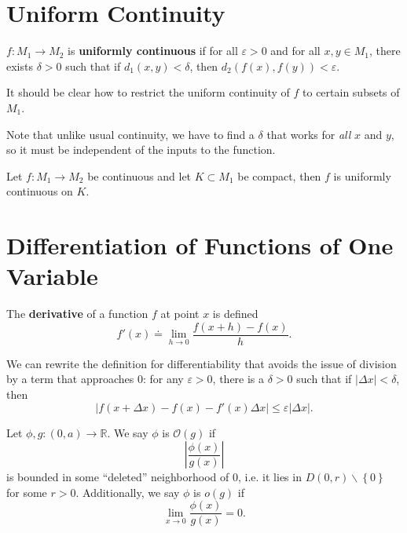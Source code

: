 \documentclass[twoside,10pt]{report}
\begin{document}

\section{Uniform Continuity}
\begin{defn}[]
	$f:M_1 \to M_2$ is \textbf{uniformly continuous} if for all $\varepsilon>0$ and for all $x,y \in M_1$, there exists $\delta>0$ such that if $d_1(x,y) < \delta$, then $d_2(f(x), f(y)) < \varepsilon$.
\end{defn}

It should be clear how to restrict the uniform continuity of $f$ to certain subsets of $M_1$.

Note that unlike usual continuity, we have to find a $\delta$ that works for \textit{all} $x$ and $y$, so it must be independent of the inputs to the function.

\begin{thrm}[]
Let $f:M_1\to M_2$ be continuous and let $K \subset M_1$ be compact, then $f$ is uniformly continuous on $K$.
\end{thrm}


\section{Differentiation of Functions of One Variable}
\begin{defn}[]
The \textbf{derivative} of a function $f$ at point $x$ is defined
\[
	f'(x) \doteq \lim_{h \to 0} \frac{f(x+h)-f(x)}{h}.
\] 
\end{defn}

We can rewrite the definition for differentiability that avoids the issue of division by a term that approaches 0: for any $\varepsilon>0$, there is a $\delta>0$ such that if $|\Delta x|< \delta$, then
\[
	|f(x + \Delta x) - f(x) - f'(x) \Delta x| \leq \varepsilon |\Delta x|.
\] 

\begin{defn}[]
	Let $\phi,g:(0,a) \to \mathbb{R}$. We say $\phi$ is $\mathcal{O}(g)$ if
	 \[
		 \left|\frac{\phi(x)}{g(x)} \right|
	 \] is bounded in some ``deleted'' neighborhood of 0, i.e. it lies in $D(0,r)\backslash\left\{ 0 \right\}$ for some $r>0$. Additionally, we say $\phi$ is $o(g)$ if \[\lim_{x \to 0} \frac{\phi(x)}{g(x)} = 0.\]
\end{defn}
\end{document}

